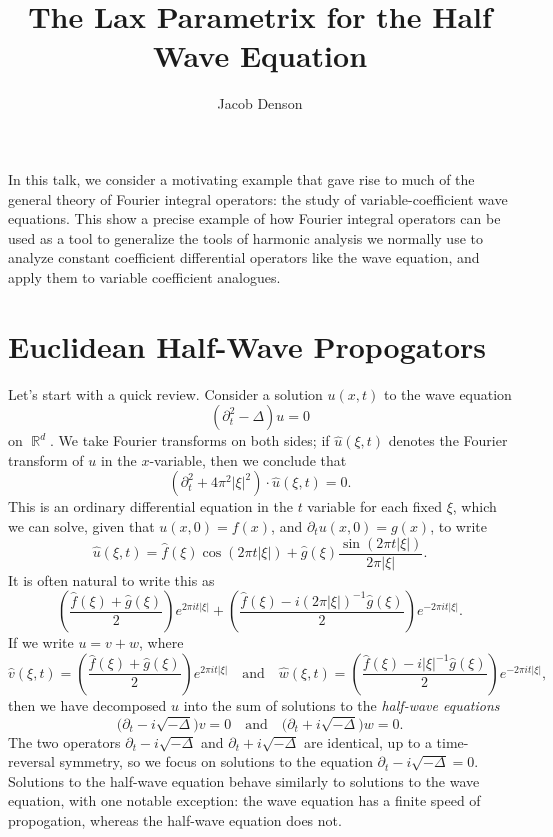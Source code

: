\documentclass{article}
\title{The Lax Parametrix for the Half Wave Equation}
\author{Jacob Denson}
\theoremstyle{plain}
\theoremstyle{remark}
\theoremstyle{definition}
\DeclareMathOperator{\RR}{\mathbb{R}}
\begin{document}
\maketitle

In this talk, we consider a motivating example that gave rise to much of the general theory of Fourier integral operators: the study of variable-coefficient wave equations. This show a precise example of how Fourier integral operators can be used as a tool to generalize the tools of harmonic analysis we normally use to analyze constant coefficient differential operators like the wave equation, and apply them to variable coefficient analogues.

\section{Euclidean Half-Wave Propogators}

Let's start with a quick review. Consider a solution $u(x,t)$ to the wave equation
%
\[ (\partial_t^2 - \Delta) u = 0 \]
%
on $\RR^d$. We take Fourier transforms on both sides; if $\widehat{u}(\xi,t)$ denotes the Fourier transform of $u$ in the $x$-variable, then we conclude that
%
\[ (\partial_t^2 + 4 \pi^2 |\xi|^2) \cdot \widehat{u}(\xi,t) = 0. \]
%
This is an ordinary differential equation in the $t$ variable for each fixed $\xi$, which we can solve, given that $u(x,0) = f(x)$, and $\partial_t u(x,0) = g(x)$, to write
%
\[ \widehat{u}(\xi,t) = \widehat{f}(\xi) \cos(2 \pi t |\xi|) + \widehat{g}(\xi) \frac{\sin(2 \pi t |\xi|)}{2 \pi |\xi|}. \]
%
It is often natural to write this as
%
\[ \left( \frac{\widehat{f}(\xi) + \widehat{g}(\xi)}{2} \right) e^{2 \pi i t |\xi|} + \left( \frac{\widehat{f}(\xi) - i (2 \pi |\xi|)^{-1} \widehat{g}(\xi)}{2} \right) e^{-2 \pi i t |\xi|}. \]
%
If we write $u = v + w$, where
%
\[ \widehat{v}(\xi,t) = \left( \frac{\widehat{f}(\xi) + \widehat{g}(\xi)}{2} \right) e^{2 \pi i t |\xi|} \quad\text{and}\quad \widehat{w}(\xi,t) = \left( \frac{\widehat{f}(\xi) - i |\xi|^{-1} \widehat{g}(\xi)}{2} \right) e^{-2 \pi i t |\xi|}, \]
%
then we have decomposed $u$ into the sum of solutions to the \emph{half-wave equations}
%
\[ \Big( \partial_t - i \sqrt{-\Delta} \Big) v = 0 \quad\text{and}\quad \Big(\partial_t + i \sqrt{-\Delta} \Big) w = 0. \]
%
The two operators $\partial_t - i \sqrt{-\Delta}$ and $\partial_t + i \sqrt{-\Delta}$ are identical, up to a time-reversal symmetry, so we focus on solutions to the equation $\partial_t - i \sqrt{-\Delta} = 0$. Solutions to the half-wave equation behave similarly to solutions to the wave equation, with one notable exception: the wave equation has a finite speed of propogation, whereas the half-wave equation does not.
\end{document}
